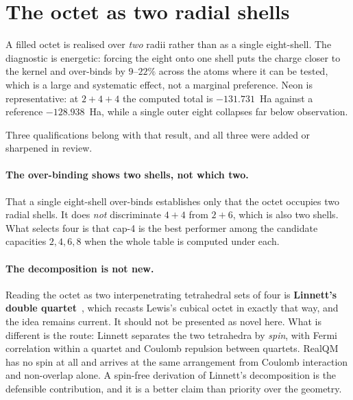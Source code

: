 \section{The octet as two radial shells}\label{sec:subshells}

A filled octet is realised over \emph{two} radii rather than as a single eight-shell. The
diagnostic is energetic: forcing the eight onto one shell puts the charge closer to the kernel and
over-binds by $9$--$22\%$ across the atoms where it can be tested, which is a large and systematic
effect, not a marginal preference. Neon is representative: at $2{+}4{+}4$ the computed total is
$-131.731$~Ha against a reference $-128.938$~Ha, while a single outer eight collapses far below
observation.

Three qualifications belong with that result, and all three were added or sharpened in review.

\paragraph{The over-binding shows two shells, not which two.}
That a single eight-shell over-binds establishes only that the octet occupies two radial shells.
It does \emph{not} discriminate $4{+}4$ from $2{+}6$, which is also two shells. What selects four
is that cap-4 is the best performer among the candidate capacities $2, 4, 6, 8$ when the whole
table is computed under each.

\paragraph{The decomposition is not new.}
Reading the octet as two interpenetrating tetrahedral sets of four is \textbf{Linnett's double
quartet}~\cite{Linnett1961}, which recasts Lewis's cubical octet in exactly that way, and the idea
remains current. It should not be presented as novel here. What is different is the route:
Linnett separates the two tetrahedra by \emph{spin}, with Fermi correlation within a quartet and
Coulomb repulsion between quartets. RealQM has no spin at all and arrives at the same arrangement
from Coulomb interaction and non-overlap alone. A spin-free derivation of Linnett's decomposition
is the defensible contribution, and it is a better claim than priority over the geometry.

